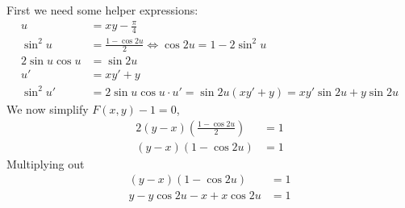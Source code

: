 First we need some helper expressions:
\begin{align}
  u &= xy-\frac{\pi}{4} \label{eq.u}\\
  \sin^2{u} &= \frac{1-\cos{2u}}{2}
      \iff \cos{2u} = 1 - 2\sin^2{u} \label{eq.cos2u} \\
  2\sin{u}\cos{u} &= \sin{2u} \\
  u' &= xy' + y \\
  \sin^2{u}' &= 2\sin{u}\cos{u}\cdot u' = \sin{2u}(xy'+y) =
      xy'\sin{2u}+y\sin{2u}
\end{align}
We now simplify $F(x,y)-1 = 0$,
\begin{align*}
  2(y-x)\left(\frac{1-\cos{2u}}{2}\right) &= 1 \\
  (y-x)(1-\cos{2u}) &= 1
\end{align*}
Multiplying out
\begin{align*}
  (y-x)(1-\cos{2u}) &= 1 \\
  y - y\cos{2u} -x + x\cos{2u} &= 1
\end{align*}
